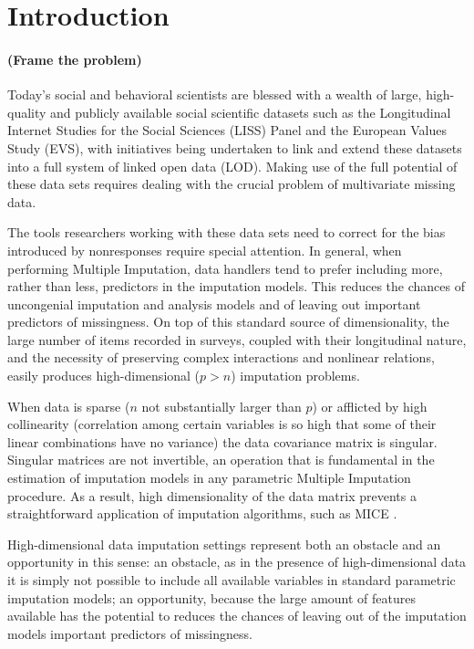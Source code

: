 \maketitle
\section{Introduction}

\paragraph{(Frame the problem)}

Today’s social and behavioral scientists are blessed with a wealth of large, high-quality and publicly available 
social scientific datasets such as the Longitudinal Internet Studies for the Social Sciences (LISS) Panel and 
the European Values Study (EVS), with initiatives being undertaken to link and extend these datasets into a full
system of linked open data (LOD).
Making use of the full potential of these data sets requires dealing with the crucial problem of multivariate
missing data.

The tools researchers working with these data sets need to correct for the bias introduced by nonresponses 
require special attention.
In general, when performing Multiple Imputation, data handlers tend to prefer including 
more, rather than less, predictors in the imputation models. This reduces the chances of uncongenial imputation 
and analysis models \citep{meng:1994} and of leaving out important predictors of missingness.
On top of this standard source of dimensionality, the large number of items recorded in surveys, coupled with their
longitudinal nature, and the necessity of preserving complex interactions and nonlinear relations, easily produces 
high-dimensional ($p>n$) imputation problems.

When data is sparse ($n$ not substantially larger than $p$) or afflicted by high collinearity (correlation among 
certain variables is so high that some of their linear combinations have no variance) the data covariance matrix
is singular. Singular matrices are not invertible, an operation that is fundamental in the
estimation of imputation models in any parametric Multiple Imputation procedure.
As a result, high dimensionality of the data matrix prevents a straightforward application of imputation algorithms, 
such as MICE \citep{vanBuuren:2012}.

High-dimensional data imputation settings represent both an obstacle and an opportunity in this sense: an 
obstacle, as in the presence of high-dimensional data it is simply not possible to include all available variables 
in standard parametric imputation models; 
an opportunity, because the large amount of features available has the potential to reduces the chances of 
leaving out of the imputation models important predictors of missingness.

